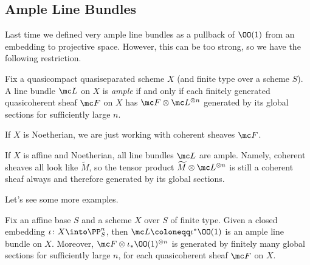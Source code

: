 \documentclass[../notes.tex]{subfiles}
\begin{document}
\subsection{Ample Line Bundles}
Last time we defined very ample line bundles as a pullback of $\OO(1)$ from an embedding to projective space. However, this can be too strong, so we have the following restriction.
\begin{definition}[Ample]
	Fix a quasicompact quasiseparated scheme $X$ (and finite type over a scheme $S$). A line bundle $\mc L$ on $X$ is \textit{ample} if and only if each finitely generated quasicoherent sheaf $\mc F$ on $X$ has $\mc F\otimes\mc L^{\otimes n}$ generated by its global sections for sufficiently large $n$.
\end{definition}
\begin{remark}
	If $X$ is Noetherian, we are just working with coherent sheaves $\mc F$.
\end{remark}
\begin{example}
	If $X$ is affine and Noetherian, all line bundles $\mc L$ are ample. Namely, coherent sheaves all look like $\widetilde M$, so the tensor product $\widetilde M\otimes\mc L^{\otimes n}$ is still a coherent sheaf always and therefore generated by its global sections.
\end{example}
Let's see some more examples.
\begin{theorem}[Serre]
	Fix an affine base $S$ and a scheme $X$ over $S$ of finite type. Given a closed embedding $\iota\colon X\into\PP^n_S$, then $\mc L\coloneqq\iota^*\OO(1)$ is an ample line bundle on $X$. Moreover, $\mc F\otimes\iota_*\OO(1)^{\otimes n}$ is generated by finitely many global sections for sufficiently large $n$, for each quasicoherent sheaf $\mc F$ on $X$.
\end{theorem}
\end{document}
